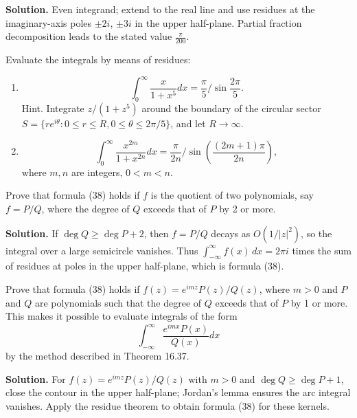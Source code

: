 \noindent\textbf{Solution.}
Even integrand; extend to the real line and use residues at the imaginary-axis poles $\pm2i$, $\pm3i$ in the upper half-plane. Partial fraction decomposition leads to the stated value $\frac{\pi}{200}$.

\begin{problembox}
Evaluate the integrals by means of residues:
\begin{enumerate}[label=(\alph*)]
\item \[ \int_0^{\infty} \frac{x}{1 + x^5} dx = \frac{\pi}{5} / \sin \frac{2\pi}{5}. \]
Hint. Integrate \( z / (1 + z^5) \) around the boundary of the circular sector \( S = \{ r e^{i\theta} : 0 \leq r \leq R, 0 \leq \theta \leq 2\pi / 5 \} \), and let \( R \to \infty \).
\item \[ \int_0^{\infty} \frac{x^{2m}}{1 + x^{2n}} dx = \frac{\pi}{2n}/ \sin \left( \frac{(2m + 1) \pi}{2n} \right), \]
where \( m, n \) are integers, \( 0 < m < n \).
\end{enumerate}
\end{problembox}



\begin{problembox}
Prove that formula (38) holds if \( f \) is the quotient of two polynomials, say \( f = P/Q \), where the degree of \( Q \) exceeds that of \( P \) by 2 or more.
\end{problembox}

\noindent\textbf{Solution.}
If $\deg Q\ge \deg P+2$, then $f=P/Q$ decays as $O(1/|z|^2)$, so the integral over a large semicircle vanishes. Thus $\int_{-\infty}^{\infty} f(x)\,dx=2\pi i$ times the sum of residues at poles in the upper half-plane, which is formula (38).

\begin{problembox}
Prove that formula (38) holds if \( f(z) = e^{imz} P(z) / Q(z) \), where \( m > 0 \) and \( P \) and \( Q \) are polynomials such that the degree of \( Q \) exceeds that of \( P \) by 1 or more. This makes it possible to evaluate integrals of the form
\[ \int_{-\infty}^{\infty} \frac{e^{imx} P(x)}{Q(x)} dx \]
by the method described in Theorem 16.37.
\end{problembox}

\noindent\textbf{Solution.}
For $f(z)=e^{imz}P(z)/Q(z)$ with $m>0$ and $\deg Q\ge \deg P+1$, close the contour in the upper half-plane; Jordan's lemma ensures the arc integral vanishes. Apply the residue theorem to obtain formula (38) for these kernels.

